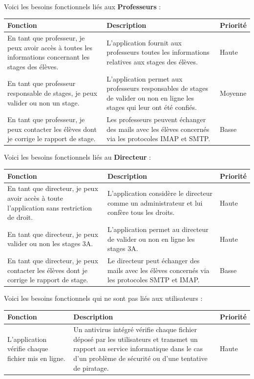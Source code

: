 \documentclass{scrreprt}
\begin{document}
\vspace{6cm}
Voici les besoins fonctionnels liés aux \textbf{Professeurs} :
\begin{center}
\begin{tabular}{|p{5cm}|p{7cm}|p{2cm}|}
  \hline
  \textbf {Fonction} & \textbf {Description} & \textbf {Priorité} \\
  \hline
  En tant que professeur, je peux avoir accès à toutes les informations concernant les stages des élèves. & L'application fournit aux professeurs toutes les informations relatives aux stages des élèves. & Haute\\
  \hline
  En tant que professeur responsable de stages, je peux valider ou non un stage. & L'application permet aux professeurs responsables de stages de valider ou non en ligne les stages qui leur ont été confiés. & Moyenne\\ 
  \hline
  En tant que professeur, je peux contacter les élèves dont je corrige le rapport de stage. & Les professeurs peuvent échanger des mails avec les élèves concernés via les protocoles IMAP et SMTP. & Basse\\ 
  \hline
\end{tabular}
\end{center}

\vspace{1cm}
Voici les besoins fonctionnels liés au \textbf{Directeur} :
\begin{center}
\begin{tabular}{|p{5cm}|p{7cm}|p{2cm}|}
  \hline
  \textbf {Fonction} & \textbf {Description} & \textbf {Priorité} \\
  \hline
  En tant que directeur, je peux avoir accès à toute l'application sans restriction de droit. & L'application considère le directeur comme un administrateur et lui confère tous les droits. & Haute\\
  \hline
  En tant que directeur, je peux valider ou non les stages 3A. & L'application permet au directeur de valider ou non en ligne les stages 3A. & Haute\\ 
  \hline
  En tant que directeur, je peux contacter les élèves dont je corrige le rapport de stage. & Le directeur peut échanger des mails avec les élèves concernés via les protocoles SMTP et IMAP. & Basse\\ 
  \hline
\end{tabular}
\end{center}

\vspace{1cm}
Voici les besoins fonctionnels qui ne sont pas liés aux utilisateurs :
\begin{center}
\begin{tabular}{|p{5cm}|p{7cm}|p{2cm}|}
  \hline
  \textbf {Fonction} & \textbf {Description} & \textbf {Priorité} \\
  \hline
  L'application vérifie chaque fichier mis en ligne. & Un antivirus intégré vérifie chaque fichier déposé par les utilisateurs et transmet un rapport au service informatique dans le cas d'un problème de sécurité ou d'une tentative de piratage. & Haute\\
  \hline
\end{tabular}
\end{center}
\end{document}
